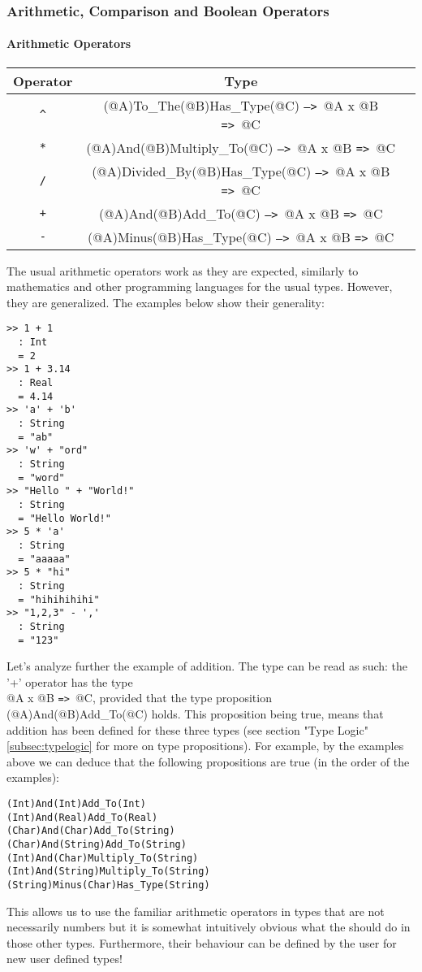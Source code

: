 \documentclass{article}
\def\ra{\texttt{=>}\ }
\def\Ra{\texttt{-->}\ }
\begin{document}
\subsubsection{Arithmetic, Comparison and Boolean Operators}

\paragraph{Arithmetic Operators}
\begin{center}
\begin{tabular}{ |c|c|c| } 
\hline
Operator & Type \\ 
\hline
\hline
\texttt{\^} & (@A)To_The(@B)Has_Type(@C) \Ra @A x @B \ra @C \\
\hline
\texttt{*} & (@A)And(@B)Multiply_To(@C) \Ra @A x @B \ra @C \\
\hline
\texttt{/} & (@A)Divided_By(@B)Has_Type(@C) \Ra @A x @B \ra @C \\
\hline
\texttt{+} & (@A)And(@B)Add_To(@C) \Ra @A x @B \ra @C \\ 
\hline
\texttt{-} & (@A)Minus(@B)Has_Type(@C) \Ra @A x @B \ra @C \\
\hline
\end{tabular}
\end{center}
The usual arithmetic operators work as they are expected, similarly to
mathematics and other programming languages for the usual types. However, they
are generalized. The examples below show their generality:
\begin{verbatim}
>> 1 + 1
  : Int
  = 2
>> 1 + 3.14
  : Real
  = 4.14
>> 'a' + 'b'
  : String
  = "ab"
>> 'w' + "ord"
  : String
  = "word"
>> "Hello " + "World!"
  : String
  = "Hello World!"
>> 5 * 'a'
  : String
  = "aaaaa"
>> 5 * "hi"
  : String
  = "hihihihihi"
>> "1,2,3" - ','
  : String
  = "123"
\end{verbatim}
Let's analyze further the example of addition. The type can be read as such:
the '+' operator has the type \\ @A x @B \ra @C, provided that the type
proposition (@A)And(@B)Add_To(@C) holds. This proposition being true, means that
addition has been defined for these three types (see section "Type Logic"
\ref{subsec:typelogic} for more on type propositions). For example, by the examples
above we can deduce that the following propositions are true (in the order of the 
examples):
\begin{verbatim}
(Int)And(Int)Add_To(Int)
(Int)And(Real)Add_To(Real)
(Char)And(Char)Add_To(String)
(Char)And(String)Add_To(String)
(Int)And(Char)Multiply_To(String)
(Int)And(String)Multiply_To(String)
(String)Minus(Char)Has_Type(String)
\end{verbatim}
This allows us to use the familiar arithmetic operators in types that are not
necessarily numbers but it is somewhat intuitively obvious what the should do
in those other types. Furthermore, their behaviour can be defined by the user
for new user defined types!
\end{document}
